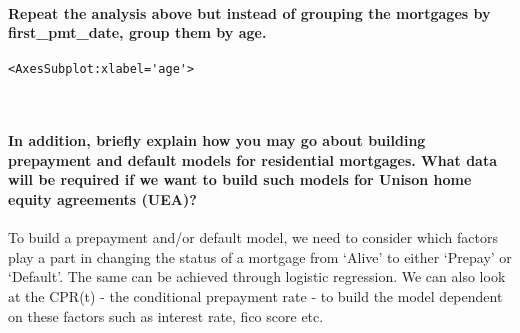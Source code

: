 \documentclass[11pt]{article}
\begin{document}
\hypertarget{repeat-the-analysis-above-but-instead-of-grouping-the-mortgages-by-first_pmt_date-group-them-by-age.}{%
\paragraph{Repeat the analysis above but instead of grouping the
mortgages by first\_pmt\_date, group them by
age.}\label{repeat-the-analysis-above-but-instead-of-grouping-the-mortgages-by-first_pmt_date-group-them-by-age.}}

            \begin{tcolorbox}[breakable, size=fbox, boxrule=.5pt, pad at break*=1mm, opacityfill=0]
\begin{Verbatim}[commandchars=\\\{\}]
<AxesSubplot:xlabel='age'>
\end{Verbatim}
\end{tcolorbox}
        
    \begin{center}
    \end{center}
    { \hspace*{\fill} \\}
    
    \hypertarget{in-addition-briefly-explain-how-you-may-go-about-building-prepayment-and-default-models-for-residential-mortgages.-what-data-will-be-required-if-we-want-to-build-such-models-for-unison-home-equity-agreements-uea}{%
\paragraph{In addition, briefly explain how you may go about building
prepayment and default models for residential mortgages. What data will
be required if we want to build such models for Unison home equity
agreements
(UEA)?}\label{in-addition-briefly-explain-how-you-may-go-about-building-prepayment-and-default-models-for-residential-mortgages.-what-data-will-be-required-if-we-want-to-build-such-models-for-unison-home-equity-agreements-uea}}

    To build a prepayment and/or default model, we need to consider which
factors play a part in changing the status of a mortgage from `Alive' to
either `Prepay' or `Default'. The same can be achieved through logistic
regression. We can also look at the CPR(t) - the conditional prepayment
rate - to build the model dependent on these factors such as interest
rate, fico score etc.
\end{document}
